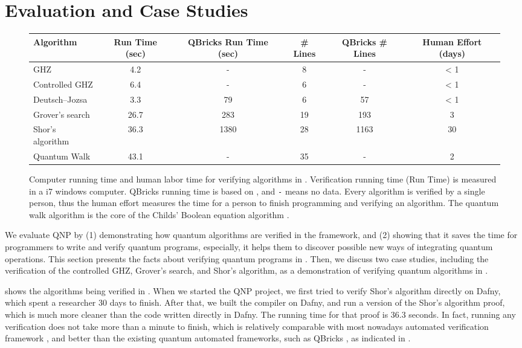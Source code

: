 \section{\qafny Evaluation and Case Studies}
\label{sec:arith-oqasm}

\begin{figure*}[t]
{\footnotesize
\begin{tabular}{|l|c|c|c|c|c|}
\hline
Algorithm & Run Time (sec) & QBricks Run Time (sec) & \# Lines& QBricks \# Lines  & Human Effort (days)\\
                     \hline
GHZ & 4.2 & - & 8 & - & < 1 \\
Controlled GHZ & 6.4 & - & 6 & - & < 1 \\
Deutsch–Jozsa & 3.3 & 79 & 6 & 57  & < 1 \\
Grover's search & 26.7 & 283 & 19 & 193 &  3\\
Shor's algorithm & 36.3 & 1380  & 28 & 1163 & 30  \\
Quantum Walk & 43.1 & - & 35 & - & 2 \\
\hline                           
\end{tabular}
}
\caption{Computer running time and human labor time for verifying algorithms in \qafny. Verification running time (Run Time) is measured in a i7 windows computer. 
QBricks running time is based on \cite{qbricks}, and \texttt{-} means no data.
Every algorithm is verified by a single person, thus the human effort measures the time for a person to finish programming and verifying an algorithm. The quantum walk algorithm is the core of the Childs' Boolean equation algorithm \cite{ChildsNAND}.}
\label{fig:circ-evaluation}
\end{figure*}

We evaluate QNP by (1) demonstrating how quantum algorithms are verified in the framework, and (2) showing that it saves the time for programmers to write and verify quantum programs, especially, it helps them to discover possible new ways of integrating quantum operations.
%
This section presents the facts about verifying quantum programs in \qafny. Then, we discuss two case studies, including the verification of the controlled GHZ, Grover's search, and Shor's algorithm, as a demonstration of verifying quantum algorithms in \qafny.

 shows the algorithms being verified in \qafny. When we started the QNP project, we first tried to verify Shor's algorithm directly on Dafny, which spent a researcher 30 days to finish. After that, we built the \qafny compiler on Dafny, and run a \qafny version of the Shor's algorithm proof, which is much more cleaner than the code written directly in Dafny. The running time for that proof is 36.3 seconds. In fact, running any \qafny verification does not take more than a minute to finish, which is relatively comparable with most nowadays automated verification framework \cite{DBLP:conf/pldi/Qiu0SM13,dafnyref}, and better than the existing quantum automated frameworks, such as QBricks \cite{qbricks}, as indicated in .

